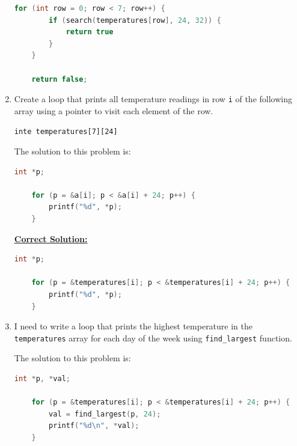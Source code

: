 \documentclass[12pt]{article}
\begin{document}
\begin{enumerate}[1.]
\begin{lstlisting}[language=c]
    for (int row = 0; row < 7; row++) {
        if (search(temperatures[row], 24, 32)) {
            return true
        }
    }

    return false;

\end{lstlisting}

    \item

    Create a loop that prints all temperature readings in row \texttt{i} of the
    following array using a pointer to visit each element of the row.

    \bigskip

    \texttt{inte temperatures[7][24]}

    \bigskip

    The solution to this problem is:

    \bigskip

\begin{lstlisting}[language=c]
    int *p;

    for (p = &a[i]; p < &a[i] + 24; p++) {
        printf("%d", *p);
    }

\end{lstlisting}

    \bigskip

    \begin{mdframed}
    \underline{\textbf{Correct Solution:}}

\begin{lstlisting}[language=c]
    int *p;

    for (p = &temperatures[i]; p < &temperatures[i] + 24; p++) {
        printf("%d", *p);
    }

\end{lstlisting}

    \end{mdframed}

    \item

    I need to write a loop that prints the highest temperature in the \texttt{temperatures}
    array for each day of the week using \texttt{find\_largest} function.

    \bigskip

    The solution to this problem is:

    \bigskip

\begin{lstlisting}[language=c]
    int *p, *val;

    for (p = &temperatures[i]; p < &temperatures[i] + 24; p++) {
        val = find_largest(p, 24);
        printf("%d\n", *val);
    }


\end{lstlisting}
\end{enumerate}
\end{document}
